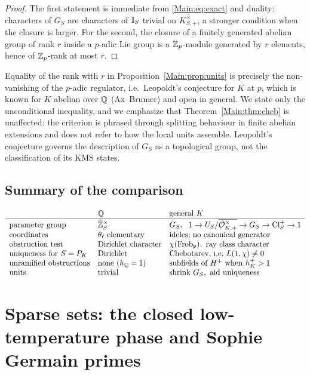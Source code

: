 \begin{proof}
The first statement is immediate from \eqref{Main:eq:exact} and duality: characters
of $G_S$ are characters of $\mathbb{I}_S$ trivial on $\overline{K^\times_{S,+}}$, a
stronger condition when the closure is larger. For the second, the closure of a
finitely generated abelian group of rank $r$ inside a $p$-adic Lie group is a
$\mathbb{Z}_p$-module generated by $r$ elements, hence of $\mathbb{Z}_p$-rank at most $r$.
\end{proof}

\begin{remark}\label{Main:rem:leopoldt}
Equality of the rank with $r$ in Proposition~\ref{Main:prop:units} is precisely the
non-vanishing of the $p$-adic regulator, i.e.\ Leopoldt's conjecture for $K$ at
$p$, which is known for $K$ abelian over $\mathbb{Q}$ (Ax--Brumer) and open in general.
We state only the unconditional inequality, and we emphasize that
Theorem~\ref{Main:thm:cheb} is unaffected: the criterion is phrased through
splitting behaviour in finite abelian extensions and does not refer to how the
local units assemble. Leopoldt's conjecture governs the description of $G_S$ as
a topological group, not the classification of its KMS states.
\end{remark}

\subsection{Summary of the comparison}

\[
\begin{array}{lll}
& \mathbb{Q} & \text{general }K\\\hline
\text{parameter group} & \widehat{\mathbb{Z}}_S^\times & G_S,\ \ 1\to U_S/\overline{\mathcal{O}^\times_{K,+}}\to G_S\to\operatorname{Cl}^+_S\to1\\
\text{coordinates} & \theta_\ell\ \text{elementary} & \text{ideles; no canonical generator}\\
\text{obstruction test} & \text{Dirichlet character} & \chi(\operatorname{Frob}_{\mathfrak{p}}),\ \text{ray class character}\\
\text{uniqueness for }S=P_K & \text{Dirichlet} & \text{Chebotarev, i.e.\ }L(1,\chi)\neq0\\
\text{unramified obstructions} & \text{none}\ (h_{\mathbb{Q}}=1) & \text{subfields of }H^+\text{ when }h^+_K>1\\
\text{units} & \text{trivial} & \text{shrink }G_S,\ \text{aid uniqueness}
\end{array}
\]
\section{Sparse sets: the closed low-temperature phase and Sophie Germain primes}\label{Main:sec:sparse}

